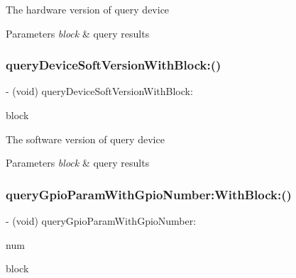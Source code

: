 The hardware version of query device


\begin{DoxyParams}{Parameters}
{\em block} & query results \\
\hline
\end{DoxyParams}
\mbox{\label{interface_p_v_mount_a6650263e34818ce41136ba4a79e790ff}} 
\subsubsection{\texorpdfstring{query\+Device\+Soft\+Version\+With\+Block\+:()}{queryDeviceSoftVersionWithBlock:()}}
{\footnotesize\ttfamily -\/ (void) query\+Device\+Soft\+Version\+With\+Block\+: \begin{DoxyParamCaption}\item[{(P\+V\+S\+D\+K\+Query\+Device\+Version\+Block)}]{block }\end{DoxyParamCaption}}

The software version of query device


\begin{DoxyParams}{Parameters}
{\em block} & query results \\
\hline
\end{DoxyParams}
\mbox{\label{interface_p_v_mount_ab039ddbded99679ac0daa857664d09b7}} 
\subsubsection{\texorpdfstring{query\+Gpio\+Param\+With\+Gpio\+Number\+:\+With\+Block\+:()}{queryGpioParamWithGpioNumber:WithBlock:()}}
{\footnotesize\ttfamily -\/ (void) query\+Gpio\+Param\+With\+Gpio\+Number\+: \begin{DoxyParamCaption}\item[{(N\+S\+Integer)}]{num }\item[{WithBlock:(P\+V\+Query\+Gpio\+Param\+Block)}]{block }\end{DoxyParamCaption}}

